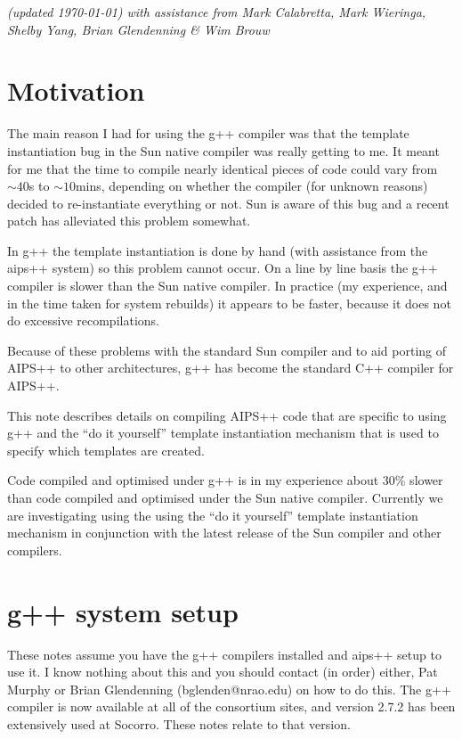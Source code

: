 \emph{(updated \today) with assistance from
  Mark Calabretta, Mark Wieringa, Shelby Yang, Brian Glendenning 
  \& Wim Brouw}

\section{Motivation}
The main reason I had for using the g++ compiler was that the template
instantiation bug in the Sun native compiler was really getting to me. It
meant for me that the time to compile nearly identical pieces of code could
vary from $\sim40$s to $\sim10$mins, depending on whether the compiler
(for unknown reasons) decided to re-instantiate everything or not. Sun is
aware of this bug and a recent patch has alleviated this problem somewhat.

In g++ the template instantiation is done by hand (with assistance from the
aips++ system) so this problem cannot occur. On a line by line basis the g++
compiler is slower than the Sun native compiler. In practice (my experience,
and in the time taken for system rebuilds) it appears to be faster,
because it does not do excessive recompilations.

Because of these problems with the standard Sun compiler and to aid
porting of AIPS++ to other architectures, g++ has become the standard
C++ compiler for AIPS++.

This note describes details on compiling AIPS++ code that are specific
to using g++ and the ``do it yourself'' template instantiation
mechanism that is used to specify which templates are created.

Code compiled and optimised under g++ is in my experience about 30\%
slower than code compiled and optimised under the Sun native compiler.
Currently we are investigating using the using the ``do it yourself''
template instantiation mechanism in conjunction with the latest
release of the Sun compiler and other compilers.

\section{g++ system setup}
These notes assume you have the g++ compilers installed and aips++
setup to use it. I know nothing about this and you should contact (in
order) either, Pat Murphy or Brian Glendenning (bglenden@nrao.edu) on
how to do this. The g++ compiler is now available at all of the
consortium sites, and version 2.7.2 has been extensively used at
Socorro. These notes relate to that version.

